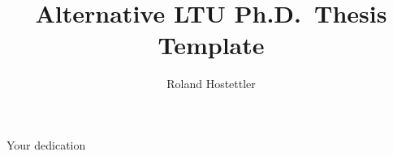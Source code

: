 \documentclass[twoside,openright,12pt,a4paper,thumbmarks]{ltuthesis}
\begin{document}
%
%
%
%


%

\title{Alternative LTU Ph.D.\ Thesis Template}
\author{Roland Hostettler}
\address{Department of Computer Science, Electrical and Space Engineering\\
	Division of Signals and Systems\\
	Luleå University of Technology\\
	Luleå, Sweden}
\maketitle

\begin{dedication}
    Your dedication
\end{dedication}

\begin{abstract}
    
\end{abstract}
\end{document}
